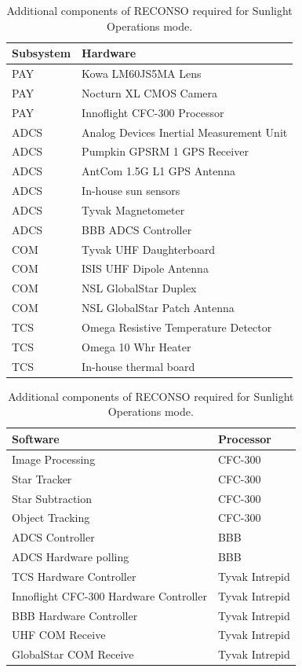 \documentclass{article}
\begin{document}
\begin{table}[h!]
\caption{Additional components of RECONSO required for Sunlight Operations mode.}
\begin{adjustbox}{center}
\begin{tabular}{|l|l|}
\hline
Subsystem & Hardware \\ \hline \hline
PAY & Kowa LM60JS5MA Lens  \\ \hline
PAY & Nocturn XL CMOS Camera  \\ \hline
PAY & Innoflight CFC-300 Processor  \\ \hline \hline
ADCS & Analog Devices Inertial Measurement Unit  \\ \hline
ADCS & Pumpkin GPSRM 1 GPS Receiver \\ \hline
ADCS & AntCom 1.5G L1 GPS Antenna  \\ \hline
ADCS & In-house sun sensors  \\ \hline
ADCS & Tyvak Magnetometer \\ \hline
ADCS & BBB ADCS Controller \\ \hline \hline
COM & Tyvak UHF Daughterboard  \\ \hline
COM & ISIS UHF Dipole Antenna  \\ \hline
COM & NSL GlobalStar Duplex  \\ \hline
COM & NSL GlobalStar Patch Antenna \\ \hline \hline
TCS & Omega Resistive Temperature Detector \\ \hline
TCS & Omega 10 Whr Heater  \\ \hline
TCS & In-house thermal board \\ \hline
\end{tabular}

\quad

\begin{tabular}{|l|l|}
\hline
Software & Processor \\ \hline \hline
Image Processing & CFC-300 \\ \hline
Star Tracker & CFC-300 \\ \hline
Star Subtraction & CFC-300 \\ \hline
Object Tracking & CFC-300 \\ \hline \hline
ADCS Controller & BBB \\ \hline
ADCS Hardware polling & BBB \\ \hline \hline
TCS Hardware Controller & Tyvak Intrepid \\ \hline
Innoflight CFC-300 Hardware Controller & Tyvak Intrepid \\ \hline
BBB Hardware Controller & Tyvak Intrepid \\ \hline
UHF COM Receive & Tyvak Intrepid \\ \hline
GlobalStar COM Receive & Tyvak Intrepid \\ \hline
\end{tabular}
\end{adjustbox}
\end{table}
\end{document}
